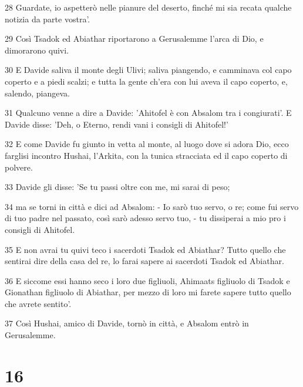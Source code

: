 \par 28 Guardate, io aspetterò nelle pianure del deserto, finché mi sia recata qualche notizia da parte vostra'.
\par 29 Così Tsadok ed Abiathar riportarono a Gerusalemme l'arca di Dio, e dimorarono quivi.
\par 30 E Davide saliva il monte degli Ulivi; saliva piangendo, e camminava col capo coperto e a piedi scalzi; e tutta la gente ch'era con lui aveva il capo coperto, e, salendo, piangeva.
\par 31 Qualcuno venne a dire a Davide: 'Ahitofel è con Absalom tra i congiurati'. E Davide disse: 'Deh, o Eterno, rendi vani i consigli di Ahitofel!'
\par 32 E come Davide fu giunto in vetta al monte, al luogo dove si adora Dio, ecco farglisi incontro Hushai, l'Arkita, con la tunica stracciata ed il capo coperto di polvere.
\par 33 Davide gli disse: 'Se tu passi oltre con me, mi sarai di peso;
\par 34 ma se torni in città e dici ad Absalom: - Io sarò tuo servo, o re; come fui servo di tuo padre nel passato, così sarò adesso servo tuo, - tu dissiperai a mio pro i consigli di Ahitofel.
\par 35 E non avrai tu quivi teco i sacerdoti Tsadok ed Abiathar? Tutto quello che sentirai dire della casa del re, lo farai sapere ai sacerdoti Tsadok ed Abiathar.
\par 36 E siccome essi hanno seco i loro due figliuoli, Ahimaats figliuolo di Tsadok e Gionathan figliuolo di Abiathar, per mezzo di loro mi farete sapere tutto quello che avrete sentito'.
\par 37 Così Hushai, amico di Davide, tornò in città, e Absalom entrò in Gerusalemme.

\chapter{16}

